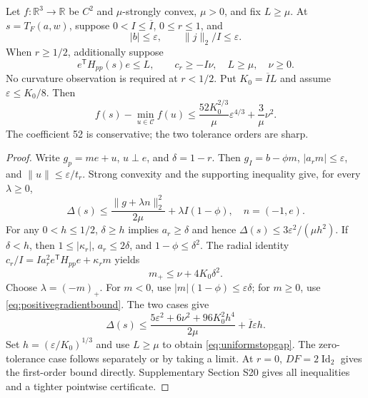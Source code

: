 \begin{theorem}
\label{thm:uniformstopping}
Let $f:\mathbb R^3\to\mathbb R$ be $C^2$ and $\mu$-strongly convex, $\mu>0$, and fix $L\ge\mu$. At $s=T_F(a,w)$, suppose $0<I\le\overline I$, $0\le r\le1$, and
\begin{equation}
 |b|\le\varepsilon,\qquad \|j\|_2/I\le\varepsilon.
 \label{eq:normalizedstop}
\end{equation}
When $r\ge1/2$, additionally suppose
\begin{equation}
 e^{\mathsf T}H_{pp}(s)e\le L,\qquad c_r\ge-I\nu,
 \quad L\ge\mu,\quad \nu\ge0.
 \label{eq:radialstop}
\end{equation}
No curvature observation is required at $r<1/2$. Put $K_0=\overline I L$ and assume $\varepsilon\le K_0/8$. Then
\begin{equation}
 \boxed{\ f(s)-\min_{u\in\mathcal C}f(u)
 \le \frac{52K_0^{2/3}}{\mu}\varepsilon^{4/3}
       +\frac{3}{\mu}\nu^2.\ }
 \label{eq:uniformstopgap}
\end{equation}
The coefficient 52 is conservative; the two tolerance orders are sharp.
\end{theorem}
\begin{proof}
Write $g_p=me+u$, $u\perp e$, and $\delta=1-r$. Then $g_I=b-\phi m$, $|a_rm|\le\varepsilon$, and $\|u\|\le\varepsilon/t_r$. Strong convexity and the supporting inequality give, for every $\lambda\ge0$,
\begin{equation}
 \Delta(s)\le\frac{\|g+\lambda n\|_2^2}{2\mu}
                  +\lambda I(1-\phi),\quad n=(-1,e).
 \label{eq:strongstopdual}
\end{equation}
For any $0<h\le1/2$, $\delta\ge h$ implies $a_r\ge\delta$ and hence $\Delta(s)\le3\varepsilon^2/(\mu h^2)$. If $\delta<h$, then $1\le|\kappa_r|$, $a_r\le2\delta$, and $1-\phi\le\delta^2$. The radial identity $c_r/I=Ia_r^2 e^{\mathsf T}H_{pp}e+\kappa_r m$ yields
\begin{equation}
 m_+\le\nu+4K_0\delta^2.
 \label{eq:positivegradientbound}
\end{equation}
Choose $\lambda=(-m)_+$. For $m<0$, use $|m|(1-\phi)\le\varepsilon\delta$; for $m\ge0$, use \eqref{eq:positivegradientbound}. The two cases give
\begin{equation}
 \Delta(s)\le\frac{5\varepsilon^2+6\nu^2+96K_0^2h^4}{2\mu}
                  +\overline I\varepsilon h.
 \label{eq:bandstopgap}
\end{equation}
Set $h=(\varepsilon/K_0)^{1/3}$ and use $L\ge\mu$ to obtain \eqref{eq:uniformstopgap}. The zero-tolerance case follows separately or by taking a limit. At $r=0$, $DF=2\operatorname{Id}_2$ gives the first-order bound directly. Supplementary Section S20 gives all inequalities and a tighter pointwise certificate.
\end{proof}

